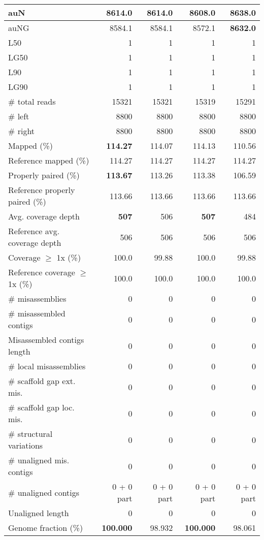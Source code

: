 \documentclass[12pt,a4paper]{article}
\begin{document}
\begin{table}[ht]
\begin{center}
\begin{tabular}{|l*{4}{|r}|}
auN & 8614.0 & 8614.0 & 8608.0 & {\bf 8638.0} \\ \hline
auNG & 8584.1 & 8584.1 & 8572.1 & {\bf 8632.0} \\ \hline
L50 & 1 & 1 & 1 & 1 \\ \hline
LG50 & 1 & 1 & 1 & 1 \\ \hline
L90 & 1 & 1 & 1 & 1 \\ \hline
LG90 & 1 & 1 & 1 & 1 \\ \hline
\# total reads & 15321 & 15321 & 15319 & 15291 \\ \hline
\# left & 8800 & 8800 & 8800 & 8800 \\ \hline
\# right & 8800 & 8800 & 8800 & 8800 \\ \hline
Mapped (\%) & {\bf 114.27} & 114.07 & 114.13 & 110.56 \\ \hline
Reference mapped (\%) & 114.27 & 114.27 & 114.27 & 114.27 \\ \hline
Properly paired (\%) & {\bf 113.67} & 113.26 & 113.38 & 106.59 \\ \hline
Reference properly paired (\%) & 113.66 & 113.66 & 113.66 & 113.66 \\ \hline
Avg. coverage depth & {\bf 507} & 506 & {\bf 507} & 484 \\ \hline
Reference avg. coverage depth & 506 & 506 & 506 & 506 \\ \hline
Coverage $\geq$ 1x (\%) & 100.0 & 99.88 & 100.0 & 99.88 \\ \hline
Reference coverage $\geq$ 1x (\%) & 100.0 & 100.0 & 100.0 & 100.0 \\ \hline
\# misassemblies & 0 & 0 & 0 & 0 \\ \hline
\# misassembled contigs & 0 & 0 & 0 & 0 \\ \hline
Misassembled contigs length & 0 & 0 & 0 & 0 \\ \hline
\# local misassemblies & 0 & 0 & 0 & 0 \\ \hline
\# scaffold gap ext. mis. & 0 & 0 & 0 & 0 \\ \hline
\# scaffold gap loc. mis. & 0 & 0 & 0 & 0 \\ \hline
\# structural variations & 0 & 0 & 0 & 0 \\ \hline
\# unaligned mis. contigs & 0 & 0 & 0 & 0 \\ \hline
\# unaligned contigs & 0 + 0 part & 0 + 0 part & 0 + 0 part & 0 + 0 part \\ \hline
Unaligned length & 0 & 0 & 0 & 0 \\ \hline
Genome fraction (\%) & {\bf 100.000} & 98.932 & {\bf 100.000} & 98.061 \\ \hline

\end{tabular}
\end{center}
\end{table}
\end{document}
